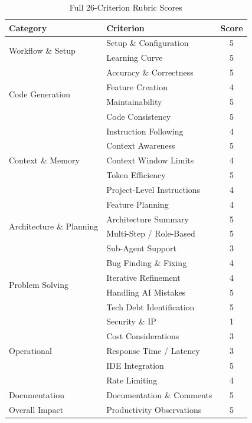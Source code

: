 \documentclass[conference]{IEEEtran}
\begin{document}
\begin{table}[t]
\caption{Full 26-Criterion Rubric Scores}
\label{tab:full_rubric}
\centering
\begin{tabular}{p{3.2cm}lc}
\toprule
\textbf{Category} & \textbf{Criterion} & \textbf{Score} \\
\midrule
\multirow{2}{*}{Workflow \& Setup} & Setup \& Configuration & 5 \\
 & Learning Curve & 5 \\
\midrule
\multirow{4}{*}{Code Generation} & Accuracy \& Correctness & 5 \\
 & Feature Creation & 4 \\
 & Maintainability & 5 \\
 & Code Consistency & 5 \\
\midrule
\multirow{5}{*}{Context \& Memory} & Instruction Following & 4 \\
 & Context Awareness & 5 \\
 & Context Window Limits & 4 \\
 & Token Efficiency & 5 \\
 & Project-Level Instructions & 4 \\
\midrule
\multirow{4}{*}{\parbox{3cm}{Architecture \& Planning}} & Feature Planning & 4 \\
 & Architecture Summary & 5 \\
 & Multi-Step / Role-Based & 5 \\
 & Sub-Agent Support & 3 \\
\midrule
\multirow{4}{*}{Problem Solving} & Bug Finding \& Fixing & 4 \\
 & Iterative Refinement & 4 \\
 & Handling AI Mistakes & 5 \\
 & Tech Debt Identification & 5 \\
\midrule
\multirow{5}{*}{Operational} & Security \& IP & 1 \\
 & Cost Considerations & 3 \\
 & Response Time / Latency & 3 \\
 & IDE Integration & 5 \\
 & Rate Limiting & 4 \\
\midrule
Documentation & Documentation \& Comments & 5 \\
\midrule
Overall Impact & Productivity Observations & 5 \\
\bottomrule
\end{tabular}
\end{table}
\end{document}
